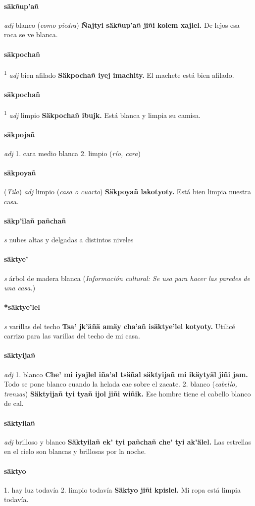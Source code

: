 \documentclass{scrbook}
\newcommand{\entry}[1]{\paragraph{#1}}
\newcommand{\onedefinition}[1]{#1.}
\newcommand{\defsuperscript}[1]{\textsuperscript{1}}
\newcommand{\partofspeech}[1]{\textit{#1}}
\newcommand{\spanishtranslation}[1]{#1}
\newcommand{\clarification}[1]{(\textit{#1})}
\newcommand{\cholexample}[1]{\textbf{#1}}
\newcommand{\exampletranslation}[1]{#1}
\newcommand{\relevantdialect}[1]{(\textit{#1})}
\newcommand{\culturalinformation}[1]{(\textit{#1})}
\begin{document}
\begin{multicols}{2}
\entry{säkñup'añ}
\partofspeech{adj}
\spanishtranslation{blanco}
\clarification{como piedra}
\cholexample{Ñajtyi säkñup'añ jiñi kolem xajlel.}
\exampletranslation{De lejos esa roca se ve blanca.}

\entry{säkpochañ}
\defsuperscript{1}
\partofspeech{adj}
\spanishtranslation{bien afilado}
\cholexample{Säkpochañ iyej imachity.}
\exampletranslation{El machete está bien afilado.}

\entry{säkpochañ}
\defsuperscript{2}
\partofspeech{adj}
\spanishtranslation{limpio}
\cholexample{Säkpochañ ibujk.}
\exampletranslation{Está blanca y limpia su camisa.}

\entry{säkpojañ}
\partofspeech{adj}
\onedefinition{1}
\spanishtranslation{cara medio blanca}
\onedefinition{2}
\spanishtranslation{limpio}
\clarification{río, cara}

\entry{säkpoyañ}
\relevantdialect{Tila}
\partofspeech{adj}
\spanishtranslation{limpio}
\clarification{casa o cuarto}
\cholexample{Säkpoyañ lakotyoty.}
\exampletranslation{Está bien limpia nuestra casa.}

\entry{säkp'ilañ pañchañ}
\partofspeech{s}
\spanishtranslation{nubes altas y delgadas a distintos niveles}

\entry{säktye'}
\partofspeech{s}
\spanishtranslation{árbol de madera blanca}
\culturalinformation{Información cultural: Se usa para hacer las paredes de una casa.}

\entry{*säktye'lel}
\partofspeech{s}
\spanishtranslation{varillas del techo}
\cholexample{Tsa' jk'äñä amäy cha'añ isäktye'lel kotyoty.}
\exampletranslation{Utilicé carrizo para las varillas del techo de mi casa.}

\entry{säktyijañ}
\partofspeech{adj}
\onedefinition{1}
\spanishtranslation{blanco}
\cholexample{Che' mi iyajlel iña'al tsäñal säktyijañ mi ikäytyäl jiñi jam.}
\exampletranslation{Todo se pone blanco cuando la helada cae sobre el zacate.}
\onedefinition{2}
\spanishtranslation{blanco}
\clarification{cabello, trenzas}
\cholexample{Säktyijañ tyi tyañ ijol jiñi wiñik.}
\exampletranslation{Ese hombre tiene el cabello blanco de cal.}

\entry{säktyilañ}
\partofspeech{adj}
\spanishtranslation{brilloso y blanco}
\cholexample{Säktyilañ ek' tyi pañchañ che' tyi ak'älel.}
\exampletranslation{Las estrellas en el cielo son blancas y brillosas por la noche.}

\entry{säktyo}
\onedefinition{1}
\spanishtranslation{hay luz todavía}
\onedefinition{2}
\spanishtranslation{limpio todavía}
\cholexample{Säktyo jiñi kpislel.}
\exampletranslation{Mi ropa está limpia todavía.}


\end{multicols}
\end{document}
